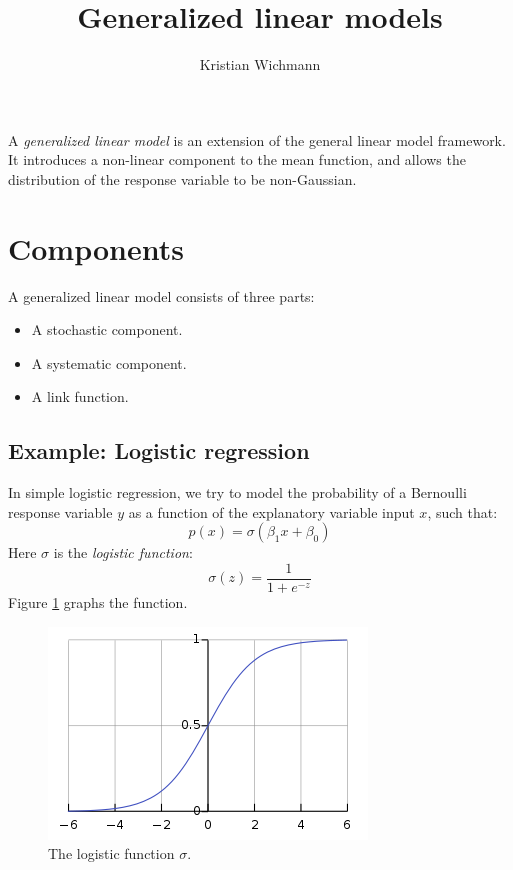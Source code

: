 \documentclass[12pt, a4paper]{article}
\title{Generalized linear models}
\author{Kristian Wichmann}
\numberwithin{equation}{section}
\begin{document}
\maketitle

A \textit{generalized linear model} is an extension of the general linear model framework. It introduces a non-linear component to the mean function, and allows the distribution of the response variable to be non-Gaussian.

\section{Components}
A generalized linear model consists of three parts:
\begin{itemize}
\item A stochastic component.
\item A systematic component.
\item A link function.
\end{itemize}

\subsection{Example: Logistic regression}
In simple logistic regression, we try to model the probability of a Bernoulli response variable $y$ as a function of the explanatory variable input $x$, such that:
\begin{equation}
p(x)=\sigma(\beta_1 x+\beta_0)
\end{equation}
Here $\sigma$ is the \textit{logistic function}:
\begin{equation}
\sigma(z)=\frac{1}{1+e^{-z}}
\end{equation}
Figure \ref{fig:logistic_function} graphs the function.

\begin{figure}
\centering
\includegraphics{logistic_function}
\caption{The logistic function $\sigma$.}
\label{fig:logistic_function}
\end{figure}
\end{document}
